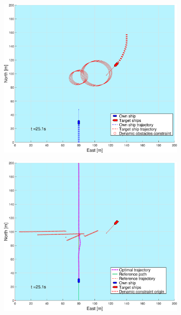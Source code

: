 \begin{figure}[ht!] %
    \begin{subfigure}[b]{0.494\textwidth}
        \centering
        \includegraphics[width=\textwidth]{Images/Figures/sving_GW/_Simple_0fig1_time=25}
        \subcaption{}
    \end{subfigure}
    \hfill
    \begin{subfigure}[b]{0.494\textwidth}
        \centering
        \includegraphics[width=\textwidth]{Images/Figures/sving_GW/_Simple_0fig999_time=25}

\end{subfigure}
\end{figure}
